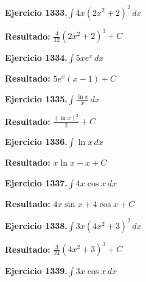 \documentclass[10pt,a4paper]{article}
\begin{document}
\newpage
\begin{ejbox}
\textbf{Ejercicio 1333.}\quad $\int 4x(2x^2 + 2)^{2}\,dx$
\end{ejbox}

\begin{solbox}
\textbf{Resultado:} \(\displaystyle \frac{4}{12}(2x^2+2)^{3} + C\)
\end{solbox}

\begin{ejbox}
\textbf{Ejercicio 1334.}\quad $\int 5x e^{x}\,dx$
\end{ejbox}

\begin{solbox}
\textbf{Resultado:} \(\displaystyle 5e^x(x-1) + C\)
\end{solbox}

\begin{ejbox}
\textbf{Ejercicio 1335.}\quad $\int \frac{\ln x}{x}\,dx$
\end{ejbox}

\begin{solbox}
\textbf{Resultado:} \(\displaystyle \frac{(\ln x)^2}{2} + C\)
\end{solbox}

\newpage
\begin{ejbox}
\textbf{Ejercicio 1336.}\quad $\int \ln x\,dx$
\end{ejbox}

\begin{solbox}
\textbf{Resultado:} \(\displaystyle x\ln x - x + C\)
\end{solbox}

\begin{ejbox}
\textbf{Ejercicio 1337.}\quad $\int 4x \cos x\,dx$
\end{ejbox}

\begin{solbox}
\textbf{Resultado:} \(\displaystyle 4x\sin x + 4\cos x + C\)
\end{solbox}

\begin{ejbox}
\textbf{Ejercicio 1338.}\quad $\int 3x(4x^2 + 3)^{2}\,dx$
\end{ejbox}

\begin{solbox}
\textbf{Resultado:} \(\displaystyle \frac{3}{24}(4x^2+3)^{3} + C\)
\end{solbox}

\newpage
\begin{ejbox}
\textbf{Ejercicio 1339.}\quad $\int 3x \cos x\,dx$
\end{ejbox}
\end{document}
